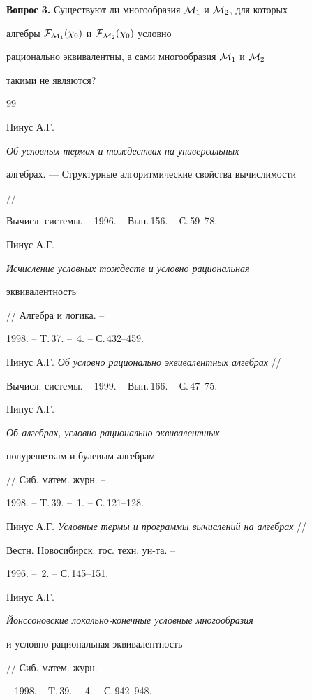 {\bf Вопрос 3.} Существуют ли многообразия ${\cal M}_1$ и ${\cal M}_2$, для которых


алгебры ${\cal F}_{{\cal M}_1}(\chi_0)$ и ${\cal F}_{{\cal M}_2}(\chi_0)$ условно


рационально эквивалентны, а сами многообразия ${\cal M}_1$ и ${\cal M}_2$


такими не являются?





\begin{thebibliography}{99}







Пинус А.Г. {\em Об условных термах и тождествах на универсальных


алгебрах. --- Структурные алгоритмические свойства вычислимости} //


Вычисл. системы. -- 1996. -- Вып.\,156. -- С.\,59--78.




Пинус А.Г. {\em Исчисление условных тождеств и условно рациональная


эквивалентность} // Алгебра и логика. --


1998. -- T.\,37. -- \No\,4. -- С.\,432--459.




Пинус А.Г. {\em Об условно рационально эквивалентных алгебрах} //


Вычисл. системы. -- 1999. -- Вып.\,166. -- С.\,47--75.




Пинус А.Г. {\em Об алгебрах, условно рационально эквивалентных


полурешеткам и булевым алгебрам} // Сиб. матем. журн. --


1998. -- T.\,39. -- \No\,1. -- С.\,121--128.




Пинус А.Г. {\em Условные термы и программы вычислений на алгебрах} //


Вестн. Новосибирск. гос. техн. ун-та. --


1996. -- \No\,2. -- С.\,145--151.




Пинус А.Г. {\em Йонссоновские локально-конечные условные многообразия 


и условно рациональная эквивалентность} // Сиб. матем. журн.


-- 1998. -- T.\,39. -- \No\,4. -- С.\,942--948.



\end{thebibliography}
